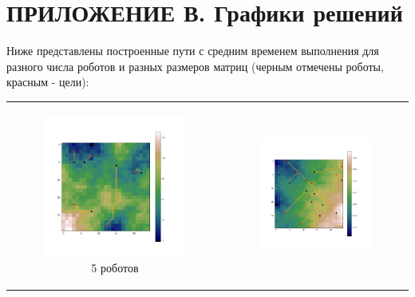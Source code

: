 \documentclass{article}
\numberwithin{equation}{section}
\begin{document}
	\section*{ПРИЛОЖЕНИЕ В. Графики решений} \label{sec:png}
	Ниже представлены построенные пути с средним временем выполнения для разного числа роботов и разных размеров матриц (черным отмечены роботы, красным - цели):
	\begin{table}[H]
		\begin{tabular}{c c}
			\begin{subfigure}{0.5\linewidth}
				\includegraphics[width = 1.0\columnwidth]{data/mean_paths/25x25/5.png}
			\caption*{5 роботов}
			\end{subfigure}
			&
			\begin{subfigure}{0.5\linewidth}
				\includegraphics[width = 1.0\columnwidth]{data/mean_paths/25x25/10.png}

\end{subfigure}
\end{tabular}
\end{table}
\end{document}
